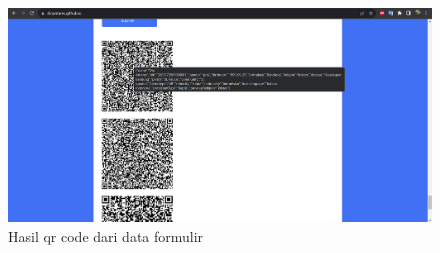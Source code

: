 \begin{figure}[H]
	\centering
	\includegraphics[scale=0.4]{Gambar/formFullQRCode.png}
	\caption{Hasil qr code dari data formulir} 
	\label{fig:formFullQRCode}
\end{figure}

